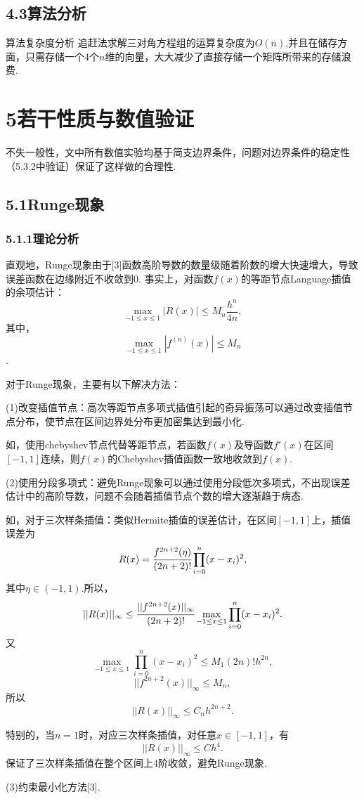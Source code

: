 \documentclass[12pt]{article}
\begin{document}
\subsection*{{\normalsize 4.3}\quad\normalsize\heiti 算法分析} 
\par 算法复杂度分析
追赶法求解三对角方程组的运算复杂度为$O(n)$,并且在储存方面，只需存储一个4个$n$维的向量，大大减少了直接存储一个矩阵所带来的存储浪费.

\section*{{\large\bf 5}\quad\large\heiti  若干性质与数值验证}
\par 不失一般性，文中所有数值实验均基于简支边界条件，问题对边界条件的稳定性（5.3.2中验证）保证了这样做的合理性.
\par 
\subsection*{{\normalsize 5.1}\quad\normalsize\heiti Runge现象} 
\subsubsection*{{\small 5.1.1}\quad\small\heiti 理论分析}
\par 直观地，Runge现象由于[3]函数高阶导数的数量级随着阶数的增大快速增大，导致误差函数在边缘附近不收敛到$0$. 事实上，对函数$f(x)$的等距节点Language插值的余项估计：
$$\mathop{\max}_{-1\leq x \leq 1} | R(x) | \leq M_{n}\frac{h^{n}}{4n},$$
其中，
$$\mathop{\max}_{-1\leq x \leq 1} |f^{(n)}(x)|\leq M_{n}$$.
\par 对于Runge现象，主要有以下解决方法：
\par (1)改变插值节点：高次等距节点多项式插值引起的奇异振荡可以通过改变插值节点分布，使节点在区间边界处分布更加密集达到最小化.
\par 如，使用chebyshev节点代替等距节点，若函数$f(x)$及导函数$f'(x)$在区间$[-1,1]$连续，则$f(x)$的Chebyshev插值函数一致地收敛到$f(x)$.
\par  (2)使用分段多项式：避免Runge现象可以通过使用分段低次多项式，不出现误差估计中的高阶导数，问题不会随着插值节点个数的增大逐渐趋于病态.
\par 如，对于三次样条插值：类似Hermite插值的误差估计，在区间$[-1,1]$上，插值误差为
$$R(x)=\cfrac{f^{2n+2}(\eta)}{(2n+2)!}\prod_{i=0}^{n}(x-x_{i})^{2},$$
其中$\eta\in(-1,1).$所以，
$$||R(x)||_{\infty}\leq\cfrac{||f^{2n+2}(x)||_{\infty}}{(2n+2)!}\mathop{\max}_{-1\leq x \leq 1}\prod_{i=0}^{n}(x-x_{i})^{2}.$$
又
$$\mathop{\max}_{-1\leq x \leq 1}\prod_{i=0}^{n}(x-x_{i})^{2}\leq M_{1}(2n)!h^{2n},$$
$$||f^{2n+2}(x)||_{\infty}\leq M_{n},$$
所以
$$||R(x)||_{\infty}\leq C_{n}h^{2n+2}.$$
\par 特别的，当$n=1$时，对应三次样条插值，对任意$x\in[-1,1]$，有
$$||R(x)||_{\infty}\leq Ch^{4}.$$
保证了三次样条插值在整个区间上4阶收敛，避免Runge现象.
\par (3)约束最小化方法[3].
\end{document}
